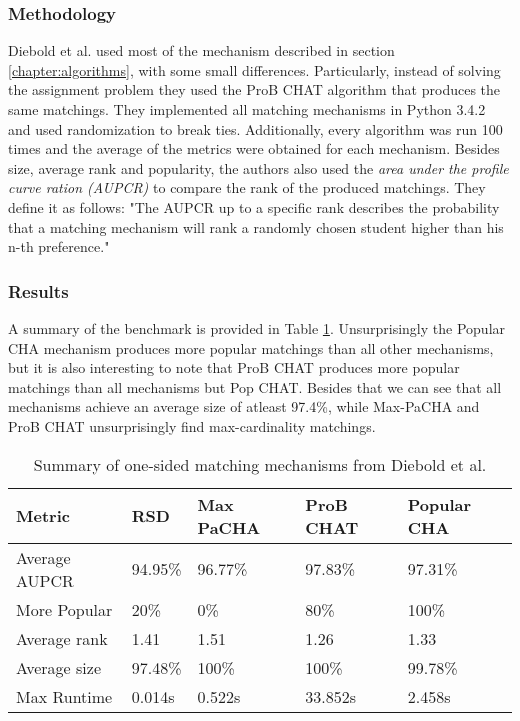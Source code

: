 \subsubsection{Methodology}
Diebold et al. used most of the mechanism described in section \ref{chapter:algorithms}, with some small differences. Particularly, instead of solving the assignment problem they used the ProB CHAT algorithm that produces the same matchings. They implemented all matching mechanisms in Python 3.4.2 and used randomization to break ties. Additionally, every algorithm was run 100 times and the average of the metrics were obtained for each mechanism. 
Besides size, average rank and popularity, the authors also used the \emph{area under the profile curve ration (AUPCR)} to compare the rank of the produced matchings. They define it as follows: "The AUPCR up to a specific rank describes the probability that a matching mechanism will rank a randomly chosen student higher than his n-th preference."\cite{DieboldBenchmark}

\subsubsection{Results}
A summary of the benchmark is provided in Table \ref{tab:diebold-benchmark}. Unsurprisingly the Popular CHA mechanism produces more popular matchings than all other mechanisms, but it is also interesting to note that ProB CHAT produces more popular matchings than all mechanisms but Pop CHAT. Besides that we can see that all mechanisms achieve an average size of atleast 97.4\%, while Max-PaCHA and ProB CHAT unsurprisingly find max-cardinality matchings.

\begin{table}[h!]
    \centering 
    \begin{tabular}{|l|l|l|l|l|}
        \hline
        Metric & RSD & Max PaCHA & ProB CHAT & Popular CHA \\ \hline
        Average AUPCR & 94.95\% & 96.77\% & \cellcolor[HTML]{9AFF99}97.83\% & 97.31\% \\ \hline
        More Popular & 20\% & 0\% & 80\% & \cellcolor[HTML]{9AFF99}100\% \\ \hline
        Average rank & 1.41 & 1.51 & \cellcolor[HTML]{9AFF99}1.26 & 1.33 \\ \hline
        Average size & 97.48\% & \cellcolor[HTML]{9AFF99}100\% & \cellcolor[HTML]{9AFF99}100\% & 99.78\% \\ \hline
        Max Runtime & \cellcolor[HTML]{9AFF99}0.014s & 0.522s & \cellcolor[HTML]{FFCCC9}33.852s & 2.458s \\ \hline
        \end{tabular}
    \caption{Summary of one-sided matching mechanisms from Diebold et al. \cite{DieboldBenchmark}}
    \label{tab:diebold-benchmark}
\end{table}

